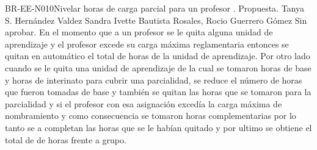 \begin{BusinessRule}{BR-EE-N010}{Nivelar horas de carga parcial para un profesor}
	{\bcCondition}    %
	{\btEnabler}     %
	{\blControlling}    %
	.
	\BRItem[Estado] Propuesta.
	 Tanya S. Hernández Valdez 
	 Sandra Ivette Bautista Rosales, Rocio Guerrero Gómez
	 Sin aprobar.
	\BRItem[Descripción] En el momento que a un profesor se le quita alguna unidad de aprendizaje y el profesor excede su carga máxima reglamentaria entonces se quitan en automático el total de horas de la unidad de aprendizaje. Por otro lado cuando se le quita una unidad de aprendizaje de la cual se tomaron horas de base y horas de interinato para cubrir una parcialidad, se reduce el número de horas que fueron tomadas de base y también se quitan las horas que se tomaron para la parcialidad y si el profesor con esa asignación excedía la carga máxima de nombramiento y como consecuencia se tomaron horas complementarias por lo tanto se a completan las horas que se le habían quitado y por ultimo se obtiene el total de de horas frente a grupo. \\
	

\end{BusinessRule}
